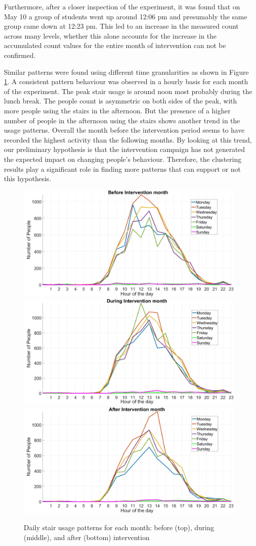 Furthermore, after a closer inspection of the experiment, it was found that on May 10 a group of students went up around 12:06 pm and presumably the same group came down at 12:23 pm. This led to an increase in the measured count across many levels, whether this alone accounts for the increase in the accumulated count values for the entire month of intervention can not be confirmed.


Similar patterns were found using different time granularities as shown in Figure \ref{spa2}. A consistent pattern behaviour was observed in a hourly basis for each month of the experiment. The peak stair usage is around noon most probably during the lunch break. The people count is asymmetric on both sides of the peak, with more people using the stairs in the afternoon. But the presence of a higher number of people in the afternoon using the stairs shows another trend in the usage patterns. Overall the month before the intervention period seems to have recorded the highest activity than the following months. By looking at this trend, our preliminary hypothesis is that the intervention campaign has not generated the expected impact on changing people's behaviour. Therefore, the clustering results play a significant role in finding more patterns that can support or not this hypothesis.  %

\begin{figure}[tbp]
    \includegraphics[width=.49\textwidth]{image/Chapters/Chapter6/aggWeekPre.jpg}%
    \includegraphics[width=.49\textwidth]{image/Chapters/Chapter6/aggWeekInt.jpg}\hfill\centering
    \includegraphics[width=.49\textwidth]{image/Chapters/Chapter6/aggWeekpost.jpg}
    \caption{Daily stair usage patterns for each month: before (top), during (middle), and after (bottom) intervention}
    \label{spa2}
\end{figure}



